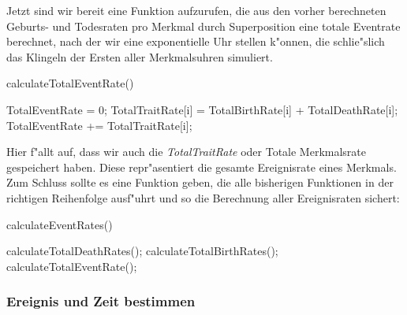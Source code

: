 \documentclass[11pt, a4paper, german]{article}
\theoremstyle{plain}
\begin{document}
	 Jetzt sind wir bereit eine Funktion aufzurufen, die aus den vorher berechneten Geburts- und Todesraten pro Merkmal durch Superposition eine totale Eventrate berechnet, nach der wir eine exponentielle Uhr stellen k"onnen, die schlie"slich das Klingeln der Ersten aller Merkmalsuhren simuliert.
	 \begin{algorithm}[H]
 		\caption{calculateTotalEventRate()}
 		\begin{algorithmic}[1]
 			\State TotalEventRate = 0;
 				\State TotalTraitRate[i] = TotalBirthRate[i] + TotalDeathRate[i];
 				\State TotalEventRate += TotalTraitRate[i];
 			\EndFor
 		\end{algorithmic}
 	\end{algorithm}
 	Hier f"allt auf, dass wir auch die \textit{TotalTraitRate} oder Totale Merkmalsrate gespeichert haben. Diese repr"asentiert die gesamte Ereignisrate eines Merkmals.\\
 	Zum Schluss sollte es eine Funktion geben, die alle bisherigen Funktionen in der richtigen Reihenfolge ausf"uhrt und so die Berechnung aller Ereignisraten sichert:
 	\begin{algorithm}[H]
 		\caption{calculateEventRates()}
 		\begin{algorithmic}[1]
 			\State calculateTotalDeathRates();
 			\State calculateTotalBirthRates();
 			\State calculateTotalEventRate();
 		\end{algorithmic}
 	\end{algorithm}
	
	\subsubsection{Ereignis und Zeit bestimmen}
	
\end{document}
